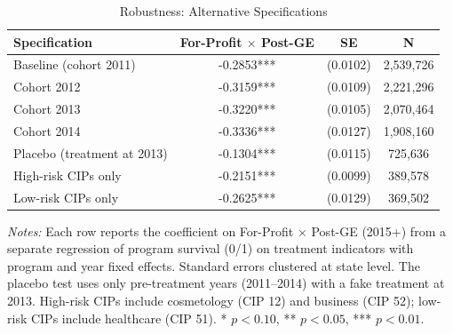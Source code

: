 \begin{table}[H]
\centering
\caption{Robustness: Alternative Specifications}
\label{tab:robustness}
\begin{threeparttable}
\begin{tabular}{lccc}
\toprule
Specification & For-Profit $\times$ Post-GE & SE & N \\
\midrule
Baseline (cohort 2011) & -0.2853*** & (0.0102) & 2,539,726 \\
Cohort 2012 & -0.3159*** & (0.0109) & 2,221,296 \\
Cohort 2013 & -0.3220*** & (0.0105) & 2,070,464 \\
Cohort 2014 & -0.3336*** & (0.0127) & 1,908,160 \\
Placebo (treatment at 2013) & -0.1304*** & (0.0115) & 725,636 \\
High-risk CIPs only & -0.2151*** & (0.0099) & 389,578 \\
Low-risk CIPs only & -0.2625*** & (0.0129) & 369,502 \\
\bottomrule
\end{tabular}
\begin{tablenotes}[flushleft]
\small
\item \textit{Notes:} Each row reports the coefficient on For-Profit $\times$ Post-GE (2015+) from a separate regression of program survival (0/1) on treatment indicators with program and year fixed effects. Standard errors clustered at state level. The placebo test uses only pre-treatment years (2011--2014) with a fake treatment at 2013. High-risk CIPs include cosmetology (CIP 12) and business (CIP 52); low-risk CIPs include healthcare (CIP 51). * $p<0.10$, ** $p<0.05$, *** $p<0.01$.
\end{tablenotes}
\end{threeparttable}
\end{table}
